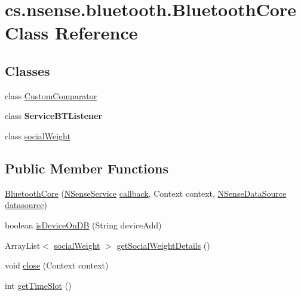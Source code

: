 \hypertarget{classcs_1_1nsense_1_1bluetooth_1_1_bluetooth_core}{\section{cs.\-nsense.\-bluetooth.\-Bluetooth\-Core Class Reference}
\label{classcs_1_1nsense_1_1bluetooth_1_1_bluetooth_core}
}
\subsection*{Classes}
\begin{DoxyCompactItemize}
\item 
class \hyperlink{classcs_1_1nsense_1_1bluetooth_1_1_bluetooth_core_1_1_custom_comparator}{Custom\-Comparator}
\item 
class {\bfseries Service\-B\-T\-Listener}
\item 
class \hyperlink{classcs_1_1nsense_1_1bluetooth_1_1_bluetooth_core_1_1social_weight}{social\-Weight}
\end{DoxyCompactItemize}
\subsection*{Public Member Functions}
\begin{DoxyCompactItemize}
\item 
\hyperlink{classcs_1_1nsense_1_1bluetooth_1_1_bluetooth_core_a8600a4e7fc8ea1ae11ffdf3257d71c28}{Bluetooth\-Core} (\hyperlink{classcs_1_1nsense_1_1_n_sense_service}{N\-Sense\-Service} \hyperlink{classcs_1_1nsense_1_1bluetooth_1_1_bluetooth_core_a983df88a78355ce8e0e3ac02c3eb24e4}{callback}, Context context, \hyperlink{classcs_1_1nsense_1_1db_1_1_n_sense_data_source}{N\-Sense\-Data\-Source} \hyperlink{classcs_1_1nsense_1_1bluetooth_1_1_bluetooth_core_a0f3b59434c3490968c51311380cd9c32}{datasource})
\item 
boolean \hyperlink{classcs_1_1nsense_1_1bluetooth_1_1_bluetooth_core_a5edc8a0f19be4268ea21b97a55ec6e1f}{is\-Device\-On\-D\-B} (String device\-Add)
\item 
Array\-List$<$ \hyperlink{classcs_1_1nsense_1_1bluetooth_1_1_bluetooth_core_1_1social_weight}{social\-Weight} $>$ \hyperlink{classcs_1_1nsense_1_1bluetooth_1_1_bluetooth_core_a664b3ba79c97a65e7b3ee4d2de1b02a0}{get\-Social\-Weight\-Details} ()
\item 
void \hyperlink{classcs_1_1nsense_1_1bluetooth_1_1_bluetooth_core_a8e7621f649d5dd7dc212467c835baab3}{close} (Context context)
\item 
int \hyperlink{classcs_1_1nsense_1_1bluetooth_1_1_bluetooth_core_a538f0c6f2f11de771381a1f01e0f7c86}{get\-Time\-Slot} ()
\end{DoxyCompactItemize}
